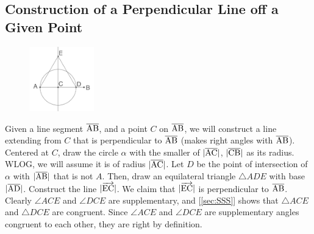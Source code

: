 \documentclass{report}
\begin{document}
\subsection{Construction of a Perpendicular Line off a Given Point}
\label{sec:perpPoint}
\begin{figure} %
    \centering
    \includegraphics[width=0.25\textwidth]{perp}
\end{figure}
Given a line segment $\overline{\rm AB}$, and a point $C$ on $\overline{\rm AB}$, we will construct a line extending from $C$ that is perpendicular to $\overline{\rm AB}$ (makes right angles with $\overline{\rm AB}$).
\\[\baselineskip]
Centered at $C$, draw the circle $\alpha$ with the smaller of $|\overline{\rm AC}|$, $|\overline{\rm CB}|$ as its radius. WLOG, we will assume it is of radius $|\overline{\rm AC}|$. Let $D$ be the point of intersection of $\alpha$ with $|\overline{\rm AB}|$ that is not $A$. Then, draw an equilateral triangle $\triangle{ADE}$ with base $|\overline{\rm AD}|$. Construct the line $|\overrightarrow{\rm EC}|$. We claim that $|\overrightarrow{\rm EC}|$ is perpendicular to $\overline{\rm AB}$.
\\Clearly $\angle ACE$ and $\angle DCE$ are supplementary, and [\ref{sec:SSS}] shows that $\triangle{ACE}$ and $\triangle{DCE}$ are congruent. Since $\angle ACE$ and $\angle DCE$ are supplementary angles congruent to each other, they are right by definition.
\\[\baselineskip]
\end{document}
